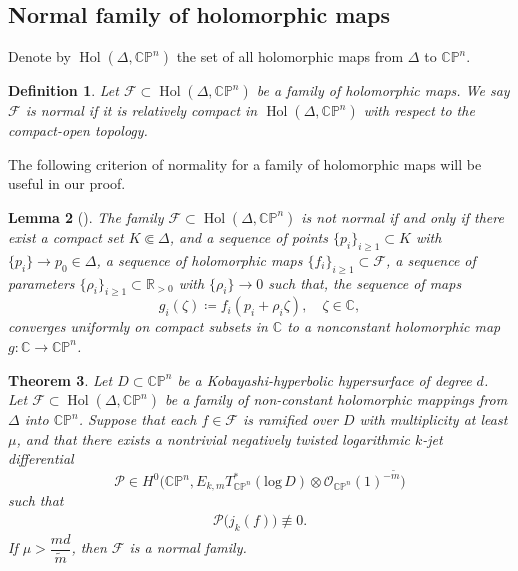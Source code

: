 \documentclass[english, 12pt]{amsart}
\DeclareMathOperator{\hol}{Hol}
\def\log{\mathrm{log}\,}
\theoremstyle{plain}
\newtheorem{thm}{Theorem}[section]
\newtheorem{lem}[thm]{{Lemma}}
\newtheorem{defi}[thm]{Definition}
\theoremstyle{remark}
\numberwithin{equation}{section}
\theoremstyle{plain}
\theoremstyle{named}
\begin{document}
\subsection{Normal family of holomorphic maps %
}
Denote by $\hol(\Delta,\mathbb{CP}^n)$ the set of all holomorphic maps from $\Delta$ to $\mathbb{CP}^n$.
\begin{defi}
	Let $\mathcal{F}\subset \hol(\Delta,\mathbb{CP}^n)$ be a family of holomorphic maps. We say $\mathcal{F}$ is normal if it is relatively compact in $\hol(\Delta,\mathbb{CP}^n)$ with respect to the compact-open topology.
\end{defi}
The following criterion of normality for a family of holomorphic maps will be useful in our proof.
\begin{lem}[\cite{ALADRO19911}]\label{lem:normal criterion}
	The family $\mathcal{F}\subset \hol(\Delta,\mathbb{CP}^n)$ is not normal if and only if there exist a compact set $K\Subset \Delta$, and a sequence of points $\{p_i\}_{i\geq 1}\subset K$ with $\{p_i\}\to p_0\in \Delta$, a sequence of holomorphic maps $\{f_i\}_{i\geq 1}\subset \mathcal{F}$, a sequence of parameters $\{\rho_i\}_{i\geq 1}\subset \mathbb{R}_{>0}$ with $\{\rho_i\}\to 0$ such that, the sequence of maps 
	\[g_i(\zeta)\coloneq f_i(p_i+\rho_i \zeta),\quad \zeta\in \mathbb{C},\]
	converges uniformly on compact subsets in $\mathbb{C}$ to a nonconstant holomorphic map $g\colon \mathbb{C}\to \mathbb{CP}^n$.
\end{lem}
\begin{thm}
	\label{normal family}
	Let $D\subset\mathbb{CP}^n$ be a Kobayashi-hyperbolic hypersurface of degree $d$. Let $\mathcal{F}\subset \hol(\Delta,\mathbb{CP}^n)$ be a family of non-constant holomorphic mappings from $\Delta$ into $\mathbb{CP}^n$. Suppose that each $f\in \mathcal{F}$ is ramified over $D$ with multiplicity at least $\mu$, and that there exists a nontrivial negatively twisted logarithmic $k$-jet differential
	\[
	\mathscr{P}
	\in
	H^0
	\big(
	\mathbb{C}\mathbb{P}^n,
	E_{k,m}T_{\mathbb{C}\mathbb{P}^n}^*(\log D)
	\otimes
	\mathcal{O}_{\mathbb{C}\mathbb{P}^n}(1)^{-\widetilde{m}}
	\big)
	\]
	such that
	\begin{align*}
		\mathscr{P}\big(j_k(f)
		\big)
		\not\equiv
		0.
	\end{align*}
	If $\mu>\dfrac{md}{\widetilde{m}}$, then $\mathcal{F}$ is a normal family.
	
\end{thm}
\end{document}
